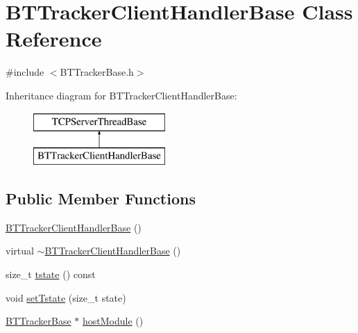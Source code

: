 \hypertarget{classBTTrackerClientHandlerBase}{}\section{B\+T\+Tracker\+Client\+Handler\+Base Class Reference}
\label{classBTTrackerClientHandlerBase}


{\ttfamily \#include $<$B\+T\+Tracker\+Base.\+h$>$}

Inheritance diagram for B\+T\+Tracker\+Client\+Handler\+Base\+:\begin{figure}[H]
\begin{center}
\leavevmode
\includegraphics[height=2.000000cm]{classBTTrackerClientHandlerBase}
\end{center}
\end{figure}
\subsection*{Public Member Functions}
\begin{DoxyCompactItemize}
\item 
\hyperlink{classBTTrackerClientHandlerBase_a47bb3ebcd53cbe2c5e97761daf238848}{B\+T\+Tracker\+Client\+Handler\+Base} ()
\item 
virtual \hyperlink{classBTTrackerClientHandlerBase_a7e6bb440aeb7dc131534bddb87f8e4bf}{$\sim$\+B\+T\+Tracker\+Client\+Handler\+Base} ()
\item 
size\+\_\+t \hyperlink{classBTTrackerClientHandlerBase_a97fe99f749f9c35265a869be509ebb97}{tstate} () const 
\item 
void \hyperlink{classBTTrackerClientHandlerBase_a1ce8a476cd3678af5b6d1a6722d5dac1}{set\+Tstate} (size\+\_\+t state)
\item 
\hyperlink{classBTTrackerBase}{B\+T\+Tracker\+Base} $\ast$ \hyperlink{classBTTrackerClientHandlerBase_a8d94ff69bfee7c7fec56ff10b023190e}{host\+Module} ()
\end{DoxyCompactItemize}
